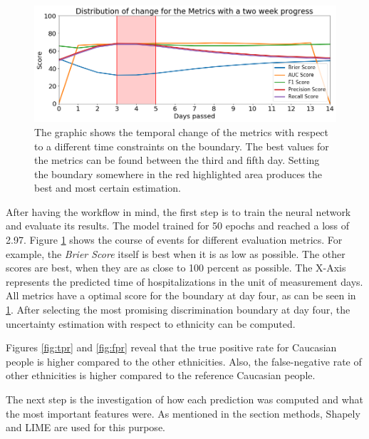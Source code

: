 \documentclass[journal]{IEEEtran}
\begin{document}
\begin{figure}[!b]
	\centering
	\includegraphics[width=0.9\linewidth]{../imgs/metrics_time}
	\caption{The graphic shows the temporal change of the metrics with respect to a different time constraints on the boundary. The best values for the metrics can be found between the third and fifth day. Setting the boundary somewhere in the red highlighted area produces the best and most certain estimation.}
	\label{fig:change}
\end{figure}


\noindent After having the workflow in mind, the first step is to train the neural network and evaluate its results. The model trained for 50 epochs and reached a loss of 2.97. Figure \ref{fig:change} shows the course of events for different evaluation metrics. For example, the \textit{Brier Score} itself is best when it is as low as possible. The other scores are best, when they are as close to 100 percent as possible. The X-Axis represents the predicted time of hospitalizations in the unit of measurement days. All metrics have a optimal score for the boundary at day four, as can be seen in \ref{fig:change}. After selecting the most promising discrimination boundary at day four, the uncertainty estimation with respect to ethnicity can be computed. 

Figures \ref{fig:tpr} and \ref{fig:fpr} reveal that the true positive rate for Caucasian people is higher compared to the other ethnicities. Also, the false-negative rate of other ethnicities is higher compared to the reference Caucasian people.  

The next step is the investigation of how each prediction was computed and what the most important features were. As mentioned in the section methods, Shapely and LIME are used for this purpose. 
\end{document}
